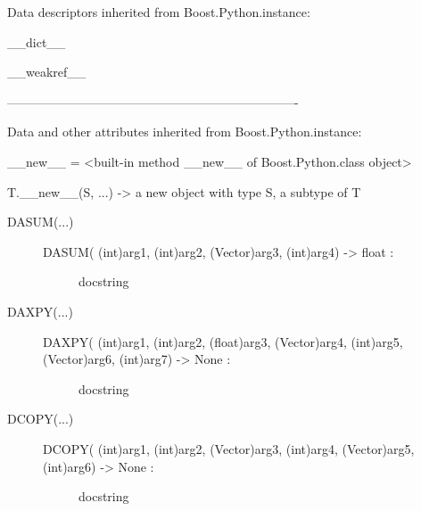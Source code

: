 \documentclass[letterpaper,10pt,english]{sphinxmanual}
\begin{document}
\begin{description}
\begin{description}
\begin{DUlineblock}{0em}
\item[] Data descriptors inherited from Boost.Python.instance:
\item[] 
\item[] \_\_dict\_\_
\item[] 
\item[] \_\_weakref\_\_
\item[] 
\item[] ----------------------------------------------------------------------
\item[] Data and other attributes inherited from Boost.Python.instance:
\item[] 
\item[] \_\_new\_\_ = \textless{}built-in method \_\_new\_\_ of Boost.Python.class object\textgreater{}
\item[]
\begin{DUlineblock}{\DUlineblockindent}
\item[] T.\_\_new\_\_(S, ...) -\textgreater{} a new object with type S, a subtype of T
\end{DUlineblock}
\end{DUlineblock}

\end{description}

\item[{FUNCTIONS}] \leavevmode\begin{description}
\item[{DASUM(...)}] \leavevmode\begin{description}
\item[{DASUM( (int)arg1, (int)arg2, (Vector)arg3, (int)arg4) -\textgreater{} float :}] \leavevmode
docstring

\end{description}

\item[{DAXPY(...)}] \leavevmode\begin{description}
\item[{DAXPY( (int)arg1, (int)arg2, (float)arg3, (Vector)arg4, (int)arg5, (Vector)arg6, (int)arg7) -\textgreater{} None :}] \leavevmode
docstring

\end{description}

\item[{DCOPY(...)}] \leavevmode\begin{description}
\item[{DCOPY( (int)arg1, (int)arg2, (Vector)arg3, (int)arg4, (Vector)arg5, (int)arg6) -\textgreater{} None :}] \leavevmode
docstring


\end{description}
\end{description}
\end{description}
\end{document}
